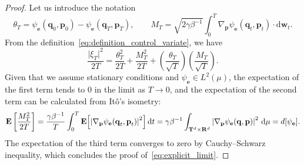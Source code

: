 \documentclass[11pt,a4paper]{article}
\newcommand{\expect}[0]{\mathbf{E}}
\newcommand{\real}{\mathbf R}
\newcommand{\torus}{\mathbf T}
\newcommand{\grad}{\nabla}
\newcommand{\vect}[1]{\boldsymbol{\mathbf #1}}
\renewcommand{\d}{\mathrm d}
\theoremstyle{plain}
\numberwithin{equation}{section}
\begin{document}
\begin{proof}
    Let us introduce the notation
    \[
        \theta_T = \psi_{\vect e}(\vect q_0, \vect p_0) - \psi_{\vect e}(\vect q_T, \vect p_T),
        \qquad
        M_T = \sqrt{2 \gamma \beta^{-1}} \int_{0}^{T} \grad_{\vect p} \psi_{\vect e}(\vect q_t, \vect p_t) \cdot \d \vect w_t.
    \]
    From the definition~\eqref{eq:definition_control_variate},
    we have
    \[
        \frac{\lvert \xi_T \rvert^2}{2T} = \frac{\theta_T^2}{2T} + \frac{M_T^2}{2T} + \left(\frac{\theta_T}{\sqrt{T}}\right) \left(\frac{M_T}{\sqrt{T}}\right).
    \]
    Given that we assume stationary conditions and $\psi_{\vect e} \in L^2(\mu)$,
    the expectation of the first term tends to 0 in the limit as $T \to 0$,
    and the expectation of the second term can be calculated from It\^o's isometry:
    \[
        \expect \left[ \frac{M_T^2}{2T} \right]
        = \frac{\gamma \beta^{-1}}{T} \int_{0}^{T} \expect \Bigl[\left\lvert \grad_{\vect p} \psi_{\vect e}(\vect q_t, \vect p_t) \right\rvert^2\Bigr] \, \d t
        = \gamma \beta^{-1} \int_{\torus^d \times \real^d} \left\lvert \grad_{\vect p} \psi_{\vect e}(\vect q, \vect p) \right\rvert^2 \, \d \mu
        = d[\psi_{\vect e}].
    \]
    The expectation of the third term converges to zero by Cauchy--Schwarz inequality,
    which concludes the proof of~\eqref{eq:explicit_limit}.
\end{proof}
\end{document}
